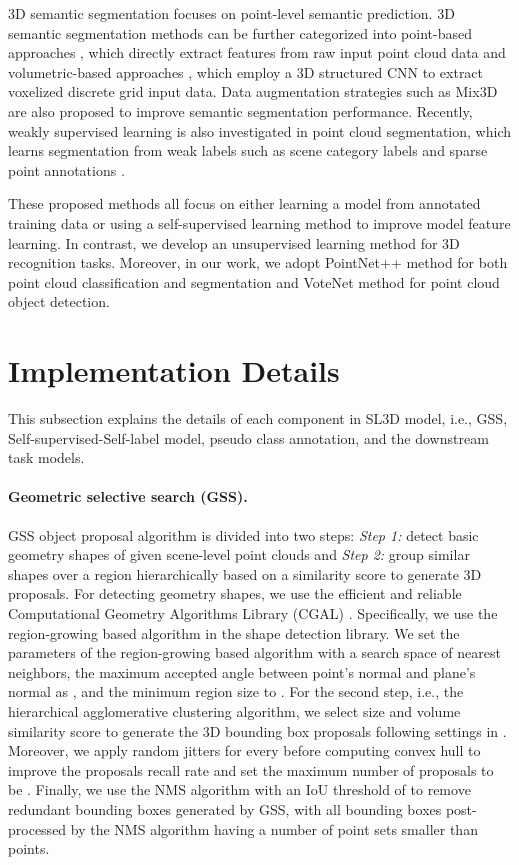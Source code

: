 \documentclass{article}
\begin{document}
{3D semantic segmentation} focuses on point-level semantic prediction. 3D semantic segmentation methods can be further categorized into point-based approaches \cite{qi2017pointnet,qi2017pointnetplusplus,zhao2021point,xu2021paconv}, which directly extract features from raw  input point cloud data and volumetric-based approaches \cite{choy20194d,graham20183d,hu2021bidirectional,hu2020jsenet} , which employ a 3D structured CNN to extract voxelized discrete grid input data. 
Data augmentation strategies such as Mix3D \cite{nekrasov2021mix3d} are also proposed to improve semantic segmentation performance. Recently, weakly supervised learning is also investigated in point cloud segmentation, which learns segmentation from weak labels such as scene category labels \cite{ren2021wypr} and sparse point annotations \cite{liu2021one}.

These proposed methods all focus on either learning a model from annotated training data or using a self-supervised learning method to improve model feature learning. In contrast, we develop an unsupervised learning method for 3D recognition tasks. Moreover, in our work, we adopt PointNet++ \cite{qi2017pointnetplusplus} method for both point cloud classification and segmentation and VoteNet \cite{qi2019deep} method for point cloud object detection. 

\section{Implementation Details}
\label{sec:implementation}
This subsection explains the details of each component in SL3D model, i.e., GSS, Self-supervised-Self-label model, pseudo class annotation, and the downstream task models.

\paragraph{Geometric selective search (GSS). }GSS object proposal algorithm is divided into two steps: \textit{Step 1: } detect basic geometry shapes of given scene-level point clouds and \textit{Step 2: } group similar shapes over a region hierarchically based on a similarity score to generate 3D proposals. For detecting geometry shapes, we use the efficient and reliable Computational Geometry Algorithms Library (CGAL) \cite{fabri2009cgal}. Specifically, we use the region-growing based algorithm in the shape detection library. We set the parameters of the region-growing based algorithm with a search space of  nearest neighbors, the maximum accepted angle between point's normal and plane's normal as , and the minimum region size to . For the second step, i.e., the hierarchical agglomerative clustering algorithm, we select size and volume similarity score to generate the 3D bounding box proposals following settings in \cite{ren2021wypr}. Moreover, we apply random jitters for every   before computing convex hull to improve the proposals recall rate and set the maximum number of proposals to be . Finally, we use the NMS algorithm with an IoU threshold of  to remove redundant bounding boxes generated by GSS, with all bounding boxes post-processed by the NMS algorithm having a number of point sets smaller than  points. 
\end{document}
